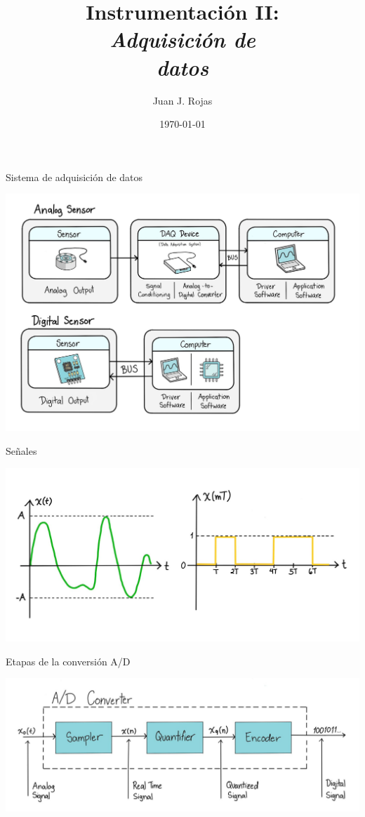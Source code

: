 \documentclass[aspectratio=169]{beamer}
\title{Instrumentación II: \\ \emph{Adquisición de}\\ \emph{datos}}
\author{Juan J. Rojas}
\institute{Instituto Tecnológico de Costa Rica}
\date{\today}
\begin{document}

\maketitle

\newcommand{\blackandwhite}{white} %

\begin{frame}{Sistema de adquisición de datos}
\begin{center}
    \includegraphics[width=0.93\linewidth]{presentaciones/fig/daqs.jpg}
\end{center}
\end{frame}

\begin{frame}{Señales}
\begin{center}
    \includegraphics[width=0.8\linewidth]{presentaciones/fig/analogicavrsdigital.jpg}
\end{center}
\end{frame}

\begin{frame}{Etapas de la conversión A/D}
\begin{center}
    \includegraphics[width=0.93\linewidth]{presentaciones/fig/convAD.jpg}
\end{center}
\end{frame}
\end{document}
